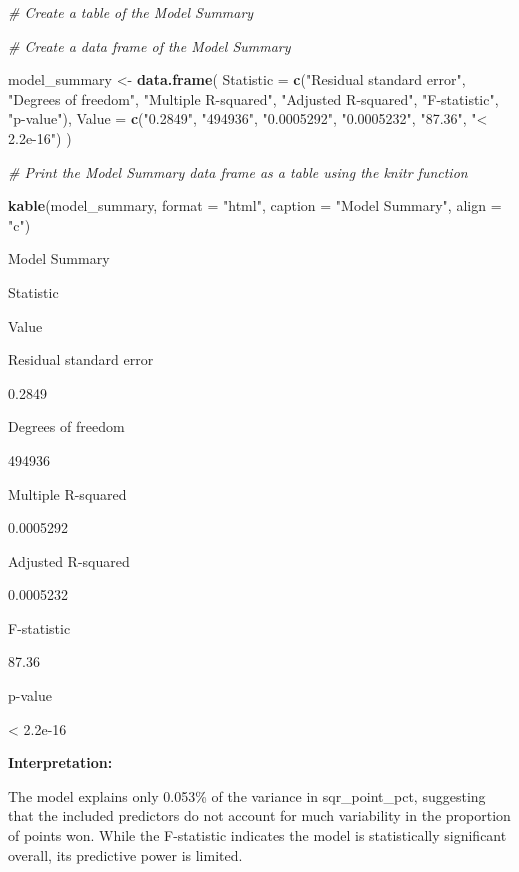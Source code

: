 \documentclass[
]{article}
\newenvironment{Shaded}{\begin{snugshade}}{\end{snugshade}}
\newcommand{\AttributeTok}[1]{\textcolor[rgb]{0.13,0.29,0.53}{#1}}
\newcommand{\CommentTok}[1]{\textcolor[rgb]{0.56,0.35,0.01}{\textit{#1}}}
\newcommand{\FunctionTok}[1]{\textcolor[rgb]{0.13,0.29,0.53}{\textbf{#1}}}
\newcommand{\NormalTok}[1]{#1}
\newcommand{\OtherTok}[1]{\textcolor[rgb]{0.56,0.35,0.01}{#1}}
\newcommand{\StringTok}[1]{\textcolor[rgb]{0.31,0.60,0.02}{#1}}
\begin{document}
\begin{Shaded}
\begin{Highlighting}[]
\CommentTok{\# Create a table of the Model Summary }

\CommentTok{\# Create a data frame of the Model Summary}

\NormalTok{model\_summary }\OtherTok{\textless{}{-}} \FunctionTok{data.frame}\NormalTok{(}
  \AttributeTok{Statistic =} \FunctionTok{c}\NormalTok{(}\StringTok{"Residual standard error"}\NormalTok{, }\StringTok{"Degrees of freedom"}\NormalTok{, }\StringTok{"Multiple R{-}squared"}\NormalTok{, }\StringTok{"Adjusted R{-}squared"}\NormalTok{, }\StringTok{"F{-}statistic"}\NormalTok{, }\StringTok{"p{-}value"}\NormalTok{),}
  \AttributeTok{Value =} \FunctionTok{c}\NormalTok{(}\StringTok{"0.2849"}\NormalTok{, }\StringTok{"494936"}\NormalTok{, }\StringTok{"0.0005292"}\NormalTok{, }\StringTok{"0.0005232"}\NormalTok{, }\StringTok{"87.36"}\NormalTok{, }\StringTok{"\textless{} 2.2e{-}16"}\NormalTok{)}
\NormalTok{)}

\CommentTok{\# Print the Model Summary data frame as a table using the knitr function}

\FunctionTok{kable}\NormalTok{(model\_summary, }\AttributeTok{format =} \StringTok{"html"}\NormalTok{, }\AttributeTok{caption =} \StringTok{"Model Summary"}\NormalTok{, }\AttributeTok{align =} \StringTok{"c"}\NormalTok{)}
\end{Highlighting}
\end{Shaded}

Model Summary

Statistic

Value

Residual standard error

0.2849

Degrees of freedom

494936

Multiple R-squared

0.0005292

Adjusted R-squared

0.0005232

F-statistic

87.36

p-value

\textless{} 2.2e-16

\textbf{Interpretation:}

The model explains only 0.053\% of the variance in sqr\_point\_pct,
suggesting that the included predictors do not account for much
variability in the proportion of points won. While the F-statistic
indicates the model is statistically significant overall, its predictive
power is limited.
\end{document}
